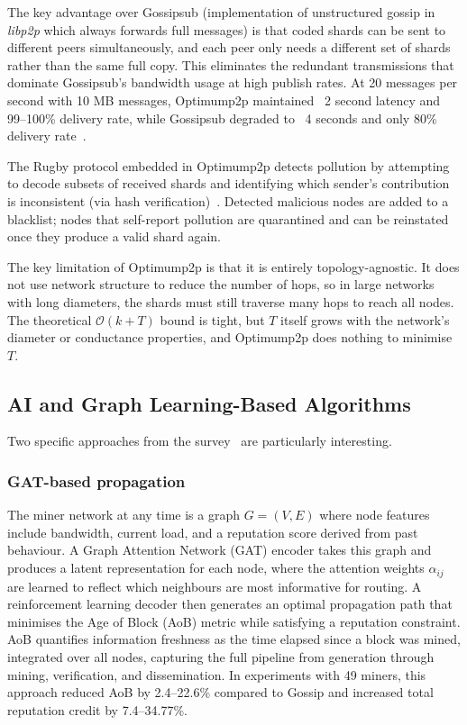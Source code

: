 \documentclass{article}
\begin{document}
The key advantage over Gossipsub (implementation of unstructured gossip in \textit{libp2p} which always forwards full messages) is that coded shards can be sent to different peers simultaneously, and each peer only needs a different set of shards rather than the same full copy. This eliminates the redundant transmissions that dominate Gossipsub's bandwidth usage at high publish rates. At 20 messages per second with 10 MB messages, Optimump2p maintained ~2 second latency and 99–100\% delivery rate, while Gossipsub degraded to ~4 seconds and only 80\% delivery rate~\cite{nicolaouOptimump2pFastReliable2025}.

The Rugby protocol embedded in Optimump2p detects pollution by attempting to decode subsets of received shards and identifying which sender's contribution is inconsistent (via hash verification)~\cite{nicolaouOptimump2pFastReliable2025}. Detected malicious nodes are added to a blacklist; nodes that self-report pollution are quarantined and can be reinstated once they produce a valid shard again.

The key limitation of Optimump2p is that it is entirely topology-agnostic. It does not use network structure to reduce the number of hops, so in large networks with long diameters, the shards must still traverse many hops to reach all nodes. The theoretical $\mathcal{O}{(k + T)}$ bound is tight, but 
$T$ itself grows with the network's diameter or conductance properties, and Optimump2p does nothing to minimise $T$.


\subsection{AI and Graph Learning-Based Algorithms}
Two specific approaches from the survey~\cite{laiAcceleratingBlockTransaction2025} are particularly interesting.
\subsubsection*{GAT-based propagation}
The miner network at any time is a graph $G = (V, E)$ where node features include bandwidth, current load, and a reputation score derived from past behaviour. A Graph Attention Network (GAT) encoder takes this graph and produces a latent representation for each node, where the attention weights $\alpha_{ij}$ are learned to reflect which neighbours are most informative for routing. A reinforcement learning decoder then generates an optimal propagation path that minimises the Age of Block (AoB) metric while satisfying a reputation constraint. AoB quantifies information freshness as the time elapsed since a block was mined, integrated over all nodes, capturing the full pipeline from generation through mining, verification, and dissemination. In experiments with 49 miners, this approach reduced AoB by 2.4–22.6\% compared to Gossip and increased total reputation credit by 7.4–34.77\%.~\cite{liaoGraphAttentionNetworkbased2024}
\end{document}
